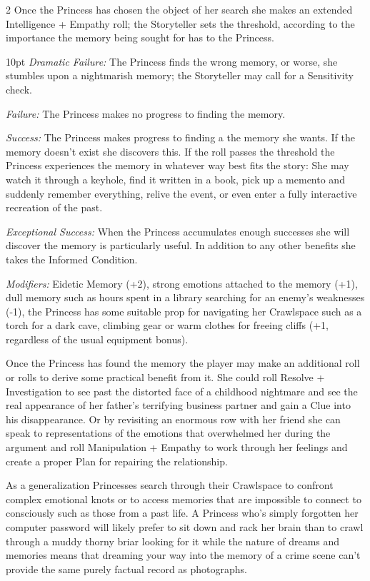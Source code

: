 \begin{multicols}{2}
Once the Princess has chosen the object of her search she makes an extended Intelligence + Empathy roll; the Storyteller sets the threshold, according to the importance the memory being sought for has to the Princess.

   \begin{myindentpar}{10pt}  \emph{Dramatic Failure:} The Princess finds the wrong memory, or worse, she stumbles upon a nightmarish memory; the Storyteller may call for a Sensitivity check.
   
    \emph{Failure:} The Princess makes no progress to finding the memory.
    
    \emph{Success:} The Princess makes progress to finding a the memory she wants. If the memory doesn't exist she discovers this. If the roll passes the threshold the Princess experiences the memory in whatever way best fits the story: She may watch it through a keyhole, find it written in a book, pick up a memento and suddenly remember everything, relive the event, or even enter a fully interactive recreation of the past. 
    
    \emph{Exceptional Success:} When the Princess accumulates enough successes she will discover the memory is particularly useful. In addition to any other benefits she takes the Informed Condition. 
    
    \emph{Modifiers:} Eidetic Memory (+2), strong emotions attached to the memory (+1), dull memory such as hours spent in a library searching for an enemy's weaknesses (-1), the Princess has some suitable prop for navigating her Crawlspace such as a torch for a dark cave, climbing gear or warm clothes for freeing cliffs (+1, regardless of the usual equipment bonus).   
	\end{myindentpar} 
	
Once the Princess has found the memory the player may make an additional roll or rolls to derive some practical benefit from it. She could roll Resolve + Investigation to see past the distorted face of a childhood nightmare and see the real appearance of her father's terrifying business partner and gain a Clue into his disappearance. Or by revisiting an enormous row with her friend she can speak to representations of the emotions that overwhelmed her during the argument and roll Manipulation + Empathy to work through her feelings and create a proper Plan for repairing the relationship.

As a generalization Princesses search through their Crawlspace to confront complex emotional knots or to access memories that are impossible to connect to consciously such as those from a past life. A Princess who's simply forgotten her computer password will likely prefer to sit down and rack her brain than to crawl through a muddy thorny briar looking for it while the nature of dreams and memories means that dreaming your way into the memory of a crime scene can't provide the same purely factual record as photographs.  
    

\end{multicols}
